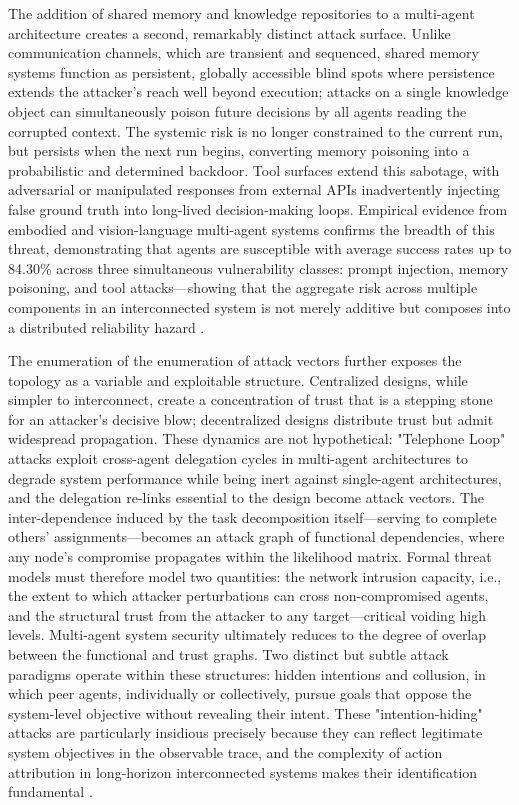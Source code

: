 \documentclass[11pt,a4paper]{article}
\begin{document}
The addition of shared memory and knowledge repositories to a multi-agent architecture creates a second, remarkably distinct attack surface. Unlike communication channels, which are transient and sequenced, shared memory systems function as persistent, globally accessible blind spots where persistence extends the attacker's reach well beyond execution; attacks on a single knowledge object can simultaneously poison future decisions by all agents reading the corrupted context. The systemic risk is no longer constrained to the current run, but persists when the next run begins, converting memory poisoning into a probabilistic and determined backdoor. Tool surfaces extend this sabotage, with adversarial or manipulated responses from external APIs inadvertently injecting false ground truth into long-lived decision-making loops. Empirical evidence from embodied and vision-language multi-agent systems confirms the breadth of this threat, demonstrating that agents are susceptible with average success rates up to 84.30\% across three simultaneous vulnerability classes: prompt injection, memory poisoning, and tool attacks---showing that the aggregate risk across multiple components in an interconnected system is not merely additive but composes into a distributed reliability hazard \cite{arxiv:2506.01245v3}.

The enumeration of the enumeration of attack vectors further exposes the topology as a variable and exploitable structure. Centralized designs, while simpler to interconnect, create a concentration of trust that is a stepping stone for an attacker's decisive blow; decentralized designs distribute trust but admit widespread propagation. These dynamics are not hypothetical: "Telephone Loop" attacks exploit cross-agent delegation cycles in multi-agent architectures to degrade system performance while being inert against single-agent architectures, and the delegation re-links essential to the design become attack vectors. The inter-dependence induced by the task decomposition itself---serving to complete others' assignments---becomes an attack graph of functional dependencies, where any node's compromise propagates within the likelihood matrix. Formal threat models must therefore model two quantities: the network intrusion capacity, i.e., the extent to which attacker perturbations can cross non-compromised agents, and the structural trust from the attacker to any target---critical voiding high levels. Multi-agent system security ultimately reduces to the degree of overlap between the functional and trust graphs. Two distinct but subtle attack paradigms operate within these structures: hidden intentions and collusion, in which peer agents, individually or collectively, pursue goals that oppose the system-level objective without revealing their intent. These "intention-hiding" attacks are particularly insidious precisely because they can reflect legitimate system objectives in the observable trace, and the complexity of action attribution in long-horizon interconnected systems makes their identification fundamental \cite{arxiv:2306.03314v1,arxiv:2412.17481v2}.
\end{document}
